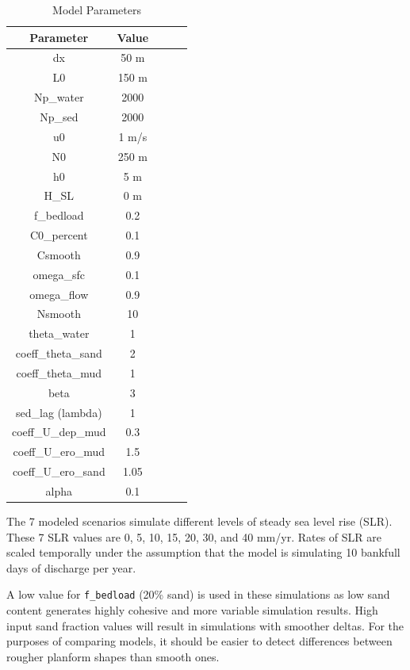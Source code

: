 \begin{table}[!ht]
\begin{center}
\begin{tabular}{| c | c | c | c | c |}
\hline
Parameter & Value \\
\hline
dx & 50 m \\
L0 & 150 m \\
Np\_water & 2000 \\
Np\_sed & 2000 \\
u0 & 1 m/s \\
N0 & 250 m \\
h0 & 5 m \\
H\_SL & 0 m \\
f\_bedload & 0.2 \\
C0\_percent & 0.1 \\
Csmooth & 0.9 \\
omega\_sfc & 0.1 \\
omega\_flow & 0.9 \\
Nsmooth & 10 \\
theta\_water & 1 \\
coeff\_theta\_sand & 2 \\
coeff\_theta\_mud & 1 \\
beta & 3 \\
sed\_lag (lambda) & 1 \\
coeff\_U\_dep\_mud & 0.3 \\
coeff\_U\_ero\_mud & 1.5 \\
coeff\_U\_ero\_sand & 1.05 \\
alpha & 0.1 \\
\hline
\end{tabular}
\caption{Model Parameters}
\label{tab:params}
\end{center}
\end{table}

The 7 modeled scenarios simulate different levels of steady sea level rise (SLR).
These 7 SLR values are 0, 5, 10, 15, 20, 30, and 40 mm/yr.
Rates of SLR are scaled temporally under the assumption that the model is simulating 10 bankfull days of discharge per year.

A low value for \texttt{f\_bedload} (20\% sand) is used in these simulations as low sand content generates highly cohesive and more variable simulation results.
High input sand fraction values will result in simulations with smoother deltas.
For the purposes of comparing models, it should be easier to detect differences between rougher planform shapes than smooth ones.


